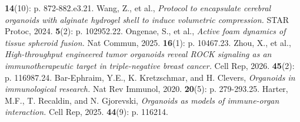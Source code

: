 \documentclass[
]{article}
\begin{document}
\textbf{14}(10): p. 872-882.e3.21. Wang, Z., et al., \emph{Protocol to encapsulate cerebral organoids with alginate hydrogel shell to induce volumetric compression.} STAR Protoc, 2024. \textbf{5}(2): p. 102952.22. Ongenae, S., et al., \emph{Active foam dynamics of tissue spheroid fusion.} Nat Commun, 2025. \textbf{16}(1): p. 10467.23. Zhou, X., et al., \emph{High-throughput engineered tumor organoids reveal ROCK signaling as an immunotherapeutic target in triple-negative breast cancer.} Cell Rep, 2026. \textbf{45}(2): p. 116987.24. Bar-Ephraim, Y.E., K. Kretzschmar, and H. Clevers, \emph{Organoids in immunological research.} Nat Rev Immunol, 2020. \textbf{20}(5): p. 279-293.25. Harter, M.F., T. Recaldin, and N. Gjorevski, \emph{Organoids as models of immune-organ interaction.} Cell Rep, 2025. \textbf{44}(9): p. 116214.
\end{document}
